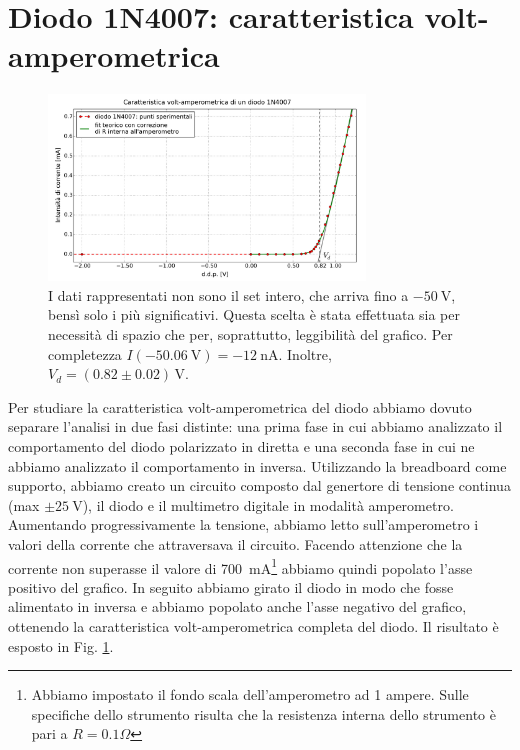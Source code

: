 \section{Diodo 1N4007: caratteristica volt-amperometrica}

\begin{figure}
	\label{fig:diodo}
	\includegraphics[width=0.75\textwidth]{diodo.pdf}
	\caption{I dati rappresentati non sono il set intero, che arriva fino a $\SI{-50}{\volt}$, bensì solo i più significativi. Questa scelta è stata effettuata sia per necessità di spazio che per, soprattutto, leggibilità del grafico. Per completezza $I(\SI{-50.06}{\volt}) = \SI{-12}{\nano\ampere}$. Inoltre, $V_d = (0.82 \pm 0.02)\,\si{\volt}$.}
	\label{fig:diodo}
\end{figure}

Per studiare la caratteristica volt-amperometrica del diodo abbiamo dovuto separare l'analisi in due fasi distinte: una prima fase in cui abbiamo analizzato il comportamento del diodo polarizzato in diretta e una seconda fase in cui ne abbiamo analizzato il comportamento in inversa.
Utilizzando la breadboard come supporto, abbiamo creato un circuito composto dal genertore di tensione continua (max $\pm \SI{25}{\volt}$), il diodo e il multimetro digitale in modalità amperometro. Aumentando progressivamente la tensione, abbiamo letto sull'amperometro i valori della corrente che attraversava il circuito.
Facendo attenzione che la corrente non superasse il valore di \SI{700}{\milli\ampere}\footnote{Abbiamo impostato il fondo scala dell'amperometro ad 1 ampere. Sulle specifiche dello strumento risulta che la resistenza interna dello strumento è pari a $R=0.1 \Omega$} abbiamo quindi popolato l'asse positivo del grafico. In seguito abbiamo girato il diodo in modo che fosse alimentato in inversa e abbiamo popolato anche l'asse negativo del grafico, ottenendo la caratteristica volt-amperometrica completa del diodo. Il risultato è esposto in Fig. \ref{fig:diodo}. 

